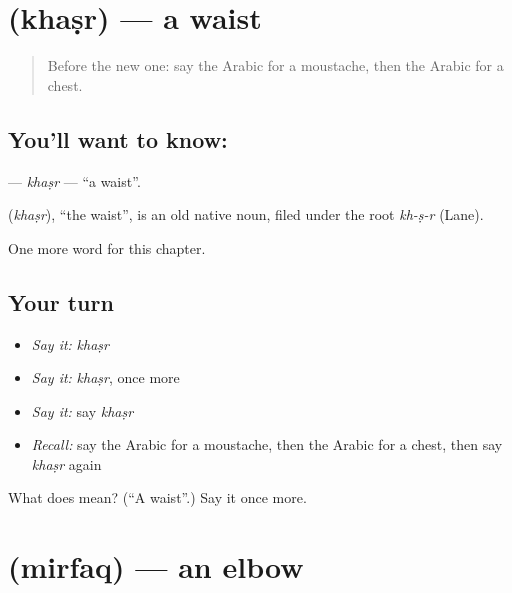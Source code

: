 \section[\texorpdfstring{\ar{خصر} (khaṣr)}{خصر (khaṣr)}]{ (khaṣr) — a waist}

\label{lesson:AR-C139-khasr}



\begin{quote}
Before the new one: say the Arabic for a moustache, then the Arabic for a chest.
\end{quote}

\subsection*{You'll want to know: }
\textbf{} — \emph{khaṣr} — \textquotedblleft{}a waist\textquotedblright{}.

\begin{cousinweb}
\textbf{} (\emph{khaṣr}), \textquotedblleft{}the waist\textquotedblright{}, is an old native noun, filed under the root \emph{kh-ṣ-r} (Lane).
\end{cousinweb}

\begin{grammarlens}[title={What you've built}]
One more word for this chapter.
\end{grammarlens}

\subsection*{Your turn}
\begin{itemize}
\raggedright
  \item \emph{Say it:} \emph{khaṣr}
  \item \emph{Say it:} \emph{khaṣr}, once more
  \item \emph{Say it:} say \emph{khaṣr}
  \item \emph{Recall:} say the Arabic for a moustache, then the Arabic for a chest, then say \emph{khaṣr} again
\end{itemize}

\begin{tcolorbox}[breakable,colback=teal!4,colframe=teal!35!black,title={Before you move on}]
What does  mean? (\textquotedblleft{}A waist\textquotedblright{}.) Say it once more.
\end{tcolorbox}
\section[\texorpdfstring{\ar{مرفق} (mirfaq)}{مرفق (mirfaq)}]{ (mirfaq) — an elbow}

